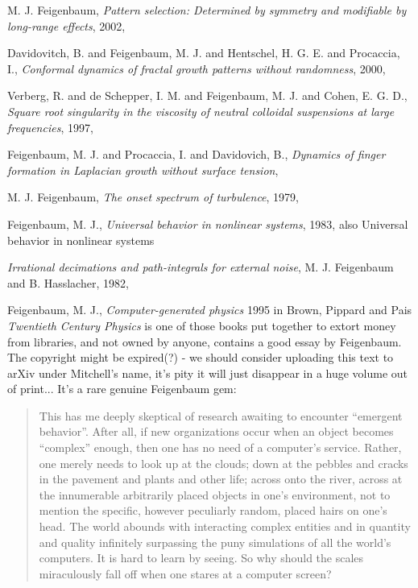 \begin{description}
{M. J. Feigenbaum},
{\em Pattern selection: {Determined} by symmetry and modifiable by long-range effects},
{2002},

{Davidovitch, B. and Feigenbaum, M. J. and Hentschel, H. G. E. and Procaccia, I.},
  {\em Conformal dynamics of fractal growth patterns without randomness},
{2000},

{Verberg, R. and de Schepper, I. M. and Feigenbaum, M. J. and Cohen, E. G. D.},
  {\em Square root singularity in the viscosity of neutral colloidal suspensions at large frequencies},
{1997},

{Feigenbaum, M. J. and Procaccia, I. and Davidovich, B.},
  {\em Dynamics of finger formation in {Laplacian} growth without surface tension},

{M. J. Feigenbaum},
{\em The onset spectrum of turbulence},
{1979},

{Feigenbaum, M. J.},
{\em Universal behavior in nonlinear systems},
{1983},
also
{Universal behavior in nonlinear systems}

{\em Irrational decimations and path-integrals for external noise},
{M. J. Feigenbaum and B. Hasslacher},
{1982},

{Feigenbaum, M. J.},
{\em Computer-generated physics}
1995 in {Brown, Pippard  and Pais}
{\em {Twentieth Century Physics}}
is one of those books put together to extort money from libraries, and
not owned by anyone, contains a good essay by Feigenbaum. The copyright
might be expired(?) - we should consider uploading this text to arXiv
under Mitchell's name, it's pity it will just disappear in a huge volume
out of print... It's a rare genuine Feigenbaum gem:

\begin{quote}
This has me deeply skeptical of research awaiting to encounter ``emergent
behavior''. After all, if new organizations occur when an object becomes
``complex'' enough, then one has no need of a computer's service. Rather,
one merely needs to look up at the clouds; down at the pebbles and cracks
in the pavement and plants and other life; across onto the river, across
at the innumerable arbitrarily placed objects in one's environment, not
to mention the specific, however peculiarly random, placed hairs on one's
head. The world abounds with interacting complex entities and in quantity
and quality infinitely surpassing the puny simulations of all the world's
computers. It is hard to learn by seeing. So why should the scales
miraculously fall off when one stares at a computer screen?


\end{quote}
\end{description}
